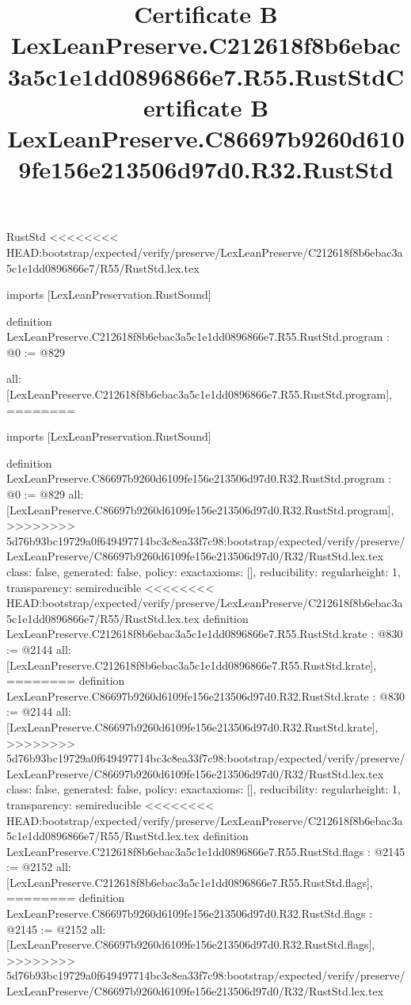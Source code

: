 \begin{lexlean}{RustStd}
<<<<<<<< HEAD:bootstrap/expected/verify/preserve/LexLeanPreserve/C212618f8b6ebac3a5c1e1dd0896866e7/R55/RustStd.lex.tex
\title{Certificate B LexLeanPreserve.C212618f8b6ebac3a5c1e1dd0896866e7.R55.RustStd}
\begin{coremodule}
imports [LexLeanPreservation.RustSound]

definition LexLeanPreserve.C212618f8b6ebac3a5c1e1dd0896866e7.R55.RustStd.program : @0 := @829 {
  all: [LexLeanPreserve.C212618f8b6ebac3a5c1e1dd0896866e7.R55.RustStd.program],
========
\title{Certificate B LexLeanPreserve.C86697b9260d6109fe156e213506d97d0.R32.RustStd}
\begin{coremodule}
imports [LexLeanPreservation.RustSound]

definition LexLeanPreserve.C86697b9260d6109fe156e213506d97d0.R32.RustStd.program : @0 := @829 {
  all: [LexLeanPreserve.C86697b9260d6109fe156e213506d97d0.R32.RustStd.program],
>>>>>>>> 5d76b93bc19729a0f649497714bc3c8ea33f7c98:bootstrap/expected/verify/preserve/LexLeanPreserve/C86697b9260d6109fe156e213506d97d0/R32/RustStd.lex.tex
  class: false,
  generated: false,
  policy: exact{axioms: []},
  reducibility: regular{height: 1},
  transparency: semireducible
}
<<<<<<<< HEAD:bootstrap/expected/verify/preserve/LexLeanPreserve/C212618f8b6ebac3a5c1e1dd0896866e7/R55/RustStd.lex.tex
definition LexLeanPreserve.C212618f8b6ebac3a5c1e1dd0896866e7.R55.RustStd.krate : @830 := @2144 {
  all: [LexLeanPreserve.C212618f8b6ebac3a5c1e1dd0896866e7.R55.RustStd.krate],
========
definition LexLeanPreserve.C86697b9260d6109fe156e213506d97d0.R32.RustStd.krate : @830 := @2144 {
  all: [LexLeanPreserve.C86697b9260d6109fe156e213506d97d0.R32.RustStd.krate],
>>>>>>>> 5d76b93bc19729a0f649497714bc3c8ea33f7c98:bootstrap/expected/verify/preserve/LexLeanPreserve/C86697b9260d6109fe156e213506d97d0/R32/RustStd.lex.tex
  class: false,
  generated: false,
  policy: exact{axioms: []},
  reducibility: regular{height: 1},
  transparency: semireducible
}
<<<<<<<< HEAD:bootstrap/expected/verify/preserve/LexLeanPreserve/C212618f8b6ebac3a5c1e1dd0896866e7/R55/RustStd.lex.tex
definition LexLeanPreserve.C212618f8b6ebac3a5c1e1dd0896866e7.R55.RustStd.flags : @2145 := @2152 {
  all: [LexLeanPreserve.C212618f8b6ebac3a5c1e1dd0896866e7.R55.RustStd.flags],
========
definition LexLeanPreserve.C86697b9260d6109fe156e213506d97d0.R32.RustStd.flags : @2145 := @2152 {
  all: [LexLeanPreserve.C86697b9260d6109fe156e213506d97d0.R32.RustStd.flags],
>>>>>>>> 5d76b93bc19729a0f649497714bc3c8ea33f7c98:bootstrap/expected/verify/preserve/LexLeanPreserve/C86697b9260d6109fe156e213506d97d0/R32/RustStd.lex.tex
}}}
\end{coremodule}}
\end{coremodule}
\end{lexlean}
